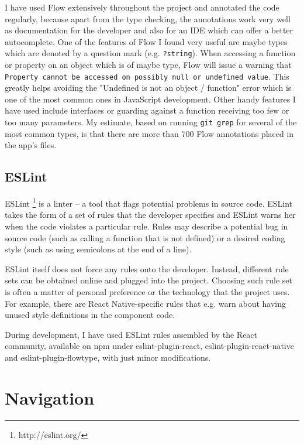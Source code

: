 



I have used Flow extensively throughout the project and annotated the code regularly, because apart from the type checking, the annotations work very well as documentation for the developer and also for an IDE which can offer a better autocomplete. One of the features of Flow I found very useful are maybe types which are denoted by a question mark (e.g. \texttt{?string}). When accessing a function or property on an object which is of maybe type, Flow will issue a warning that \texttt{Property cannot be accessed on possibly null or undefined value}. This greatly helps avoiding the "Undefined is not an object / function" error which is one of the most common ones in JavaScript development. Other handy features I have used include interfaces or guarding against a function receiving too few or too many parameters. My estimate, based on running \texttt{git grep} for several of the most common types, is that there are more than 700 Flow annotations placed in the app's files.

\subsection{ESLint}

ESLint  \footnote{http://eslint.org/}  is a linter -- a tool that flags potential problems in source code. ESLint takes the form of a set of rules that the developer specifies and ESLint warns her when the code violates a particular rule. Rules may describe a potential bug in source code (such as calling a function that is not defined) or a desired coding style (such as using semicolons at the end of a line).

ESLint itself does not force any rules onto the developer. Instead, different rule sets can be obtained online and plugged into the project. Choosing such rule set is often a matter of personal preference or the technology that the project uses. For example, there are React Native-specific rules that e.g. warn about having unused style definitions in the component code. 

During development, I have used ESLint rules assembled by the React community, available on npm under eslint-plugin-react, eslint-plugin-react-native and eslint-plugin-flowtype, with just minor modifications.


\section{Navigation}

